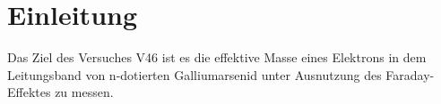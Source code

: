 \section{Einleitung}
\label{sec:einleitung}
Das Ziel des Versuches V46 ist es die effektive Masse eines Elektrons in dem Leitungsband von n-dotierten Galliumarsenid 
unter Ausnutzung des Faraday-Effektes zu messen.